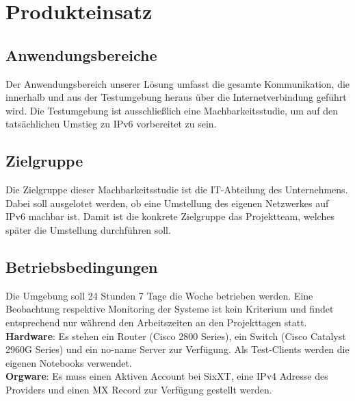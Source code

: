 \section{Produkteinsatz}

\subsection{Anwendungsbereiche}
Der Anwendungsbereich unserer Lösung umfasst die gesamte Kommunikation, die innerhalb und aus der Testumgebung heraus über die Internetverbindung geführt wird. Die Testumgebung ist ausschließlich eine Machbarkeitsstudie, um auf den tatsächlichen Umstieg zu IPv6 vorbereitet zu sein.

\subsection{Zielgruppe}
Die Zielgruppe dieser Machbarkeitsstudie ist die IT-Abteilung des Unternehmens. Dabei soll ausgelotet werden, ob eine Umstellung des eigenen Netzwerkes auf IPv6 machbar ist. Damit ist die konkrete Zielgruppe das Projektteam, welches später die Umstellung durchführen soll.

\subsection{Betriebsbedingungen}

Die Umgebung soll 24 Stunden 7 Tage die Woche betrieben werden. Eine Beobachtung respektive Monitoring der Systeme ist kein Kriterium und findet entsprechend nur während den Arbeitszeiten an den Projekttagen statt.\\

{\bf Hardware}: Es stehen ein Router (Cisco 2800 Series), ein Switch (Cisco Catalyst 2960G Series) und ein no-name Server zur Verfügung. Als Test-Clients werden die eigenen Notebooks verwendet.\\
{\bf Orgware}: Es muss einen Aktiven Account bei SixXT, eine IPv4 Adresse des Providers und einen MX Record zur Verfügung gestellt werden.
